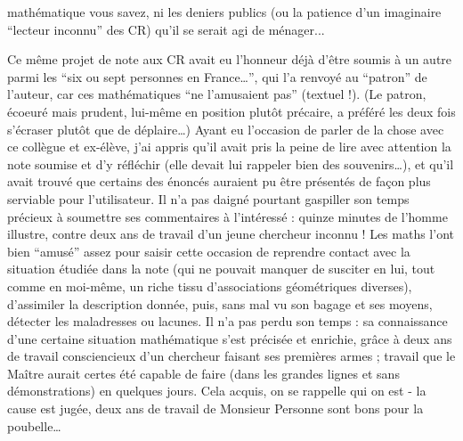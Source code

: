 mathématique vous savez, ni les deniers publics (ou la patience d'un imaginaire ``lecteur inconnu'' des CR) qu'il se serait agi de ménager...

Ce même projet de note aux CR avait eu l'honneur déjà d'être soumis à un autre parmi les ``six ou sept personnes en France\ldots'', qui l'a renvoyé au ``patron'' de l'auteur, car ces mathématiques ``ne l'amusaient pas'' (textuel !). (Le patron, écoeuré mais prudent, lui-même en position plutôt précaire, a préféré les deux fois s'écraser plutôt que de déplaire\ldots) Ayant eu l'occasion de parler de la chose avec ce collègue et ex-élève, j'ai appris qu'il avait pris la peine de lire avec attention la note soumise et d'y réfléchir (elle devait lui rappeler bien des souvenirs\ldots), et qu'il avait trouvé que certains des énoncés auraient pu être présentés de façon plus serviable pour l'utilisateur. Il n'a pas daigné pourtant gaspiller son temps précieux à soumettre ses commentaires à l'intéressé : quinze minutes de l'homme illustre, contre deux ans de travail d'un jeune chercheur inconnu ! Les maths l'ont bien ``amusé'' assez pour saisir cette occasion de reprendre contact avec la situation étudiée dans la note (qui ne pouvait manquer de susciter en lui, tout comme en moi-même, un riche tissu d'associations géométriques diverses), d'assimiler la description donnée, puis, sans mal vu son bagage et ses moyens, détecter les maladresses ou lacunes. Il n'a pas perdu son temps : sa connaissance d'une certaine situation mathématique s'est précisée et enrichie, grâce à deux ans de travail consciencieux d'un chercheur faisant ses premières armes ; travail que le Maître aurait certes été capable de faire (dans les grandes lignes et sans démonstrations) en quelques jours. Cela acquis, on se rappelle qui on est - la cause est jugée, deux ans de travail de Monsieur Personne sont bons pour la poubelle\ldots

